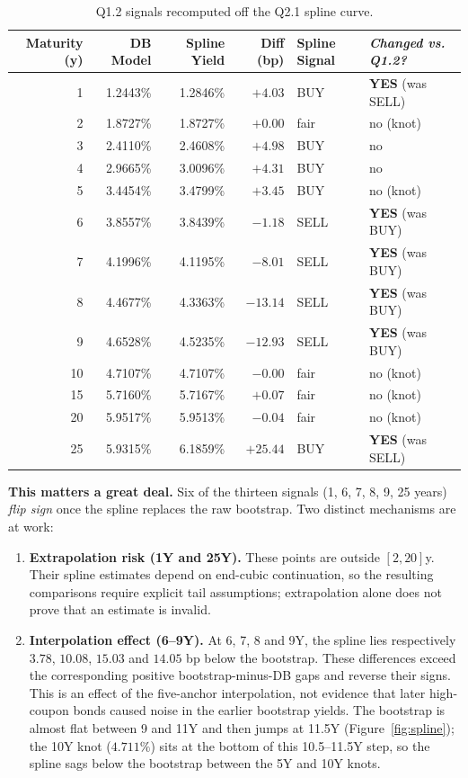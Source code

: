 \documentclass[11pt]{article}
\begin{document}
\begin{table}[htbp]
\centering
\small
\begin{tabular}{rrrrll}
\toprule
Maturity (y) & DB Model & Spline Yield & Diff (bp) & Spline Signal & \textit{Changed vs. Q1.2?} \\
\midrule
1  & 1.2443\% & 1.2846\% & $+4.03$  & BUY  & \textbf{YES} (was SELL) \\
2  & 1.8727\% & 1.8727\% & $+0.00$  & fair & no (knot) \\
3  & 2.4110\% & 2.4608\% & $+4.98$  & BUY  & no \\
4  & 2.9665\% & 3.0096\% & $+4.31$  & BUY  & no \\
5  & 3.4454\% & 3.4799\% & $+3.45$  & BUY  & no (knot) \\
6  & 3.8557\% & 3.8439\% & $-1.18$  & SELL & \textbf{YES} (was BUY) \\
7  & 4.1996\% & 4.1195\% & $-8.01$  & SELL & \textbf{YES} (was BUY) \\
8  & 4.4677\% & 4.3363\% & $-13.14$ & SELL & \textbf{YES} (was BUY) \\
9  & 4.6528\% & 4.5235\% & $-12.93$ & SELL & \textbf{YES} (was BUY) \\
10 & 4.7107\% & 4.7107\% & $-0.00$  & fair & no (knot) \\
15 & 5.7160\% & 5.7167\% & $+0.07$  & fair & no (knot) \\
20 & 5.9517\% & 5.9513\% & $-0.04$  & fair & no (knot) \\
25 & 5.9315\% & 6.1859\% & $+25.44$ & BUY  & \textbf{YES} (was SELL) \\
\bottomrule
\end{tabular}
\caption{Q1.2 signals recomputed off the Q2.1 spline curve.}
\end{table}

\textbf{This matters a great deal.} Six of the thirteen signals (1, 6, 7, 8,
9, 25 years) \emph{flip sign} once the spline replaces the raw bootstrap.
Two distinct mechanisms are at work:

\begin{enumerate}[leftmargin=1.4em]
\item \textbf{Extrapolation risk (1Y and 25Y).} These points are outside
$[2,20]$y. Their spline estimates depend on end-cubic continuation, so the
resulting comparisons require explicit tail assumptions; extrapolation
alone does not prove that an estimate is invalid.
\item \textbf{Interpolation effect (6--9Y).} At 6, 7, 8 and 9Y, the spline
lies respectively $3.78$, $10.08$, $15.03$ and $14.05$ bp below the bootstrap.
These differences exceed the corresponding positive bootstrap-minus-DB
gaps and reverse their signs. This is an effect of the five-anchor
interpolation, not evidence that later high-coupon bonds caused noise in
the earlier bootstrap yields. The bootstrap is almost flat between 9 and
11Y and then jumps at 11.5Y (Figure~\ref{fig:spline}); the 10Y knot
($4.711\%$) sits at the bottom of this 10.5--11.5Y step, so the spline sags
below the bootstrap between the 5Y and 10Y knots.
\end{enumerate}
\end{document}
